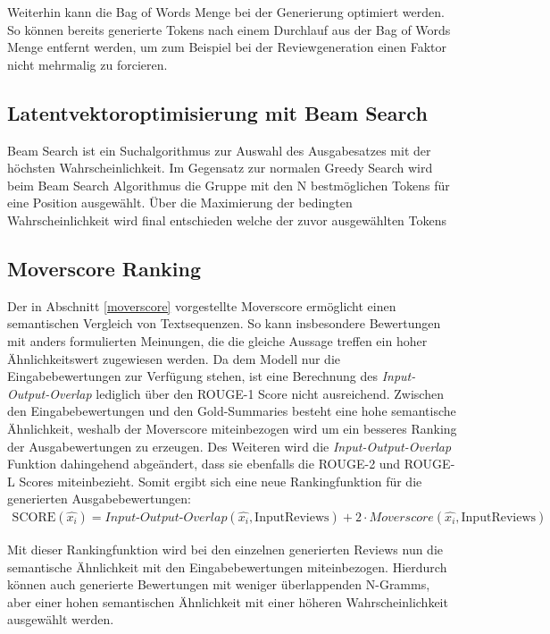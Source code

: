 Weiterhin kann die Bag of Words Menge bei der Generierung optimiert werden. 
So können bereits generierte Tokens nach einem Durchlauf aus der Bag of Words Menge entfernt werden, um zum Beispiel bei der Reviewgeneration einen Faktor nicht mehrmalig zu forcieren.


\subsection{Latentvektoroptimisierung mit Beam Search}
Beam Search ist ein Suchalgorithmus zur Auswahl des Ausgabesatzes mit der höchsten Wahrscheinlichkeit. 
Im Gegensatz zur normalen Greedy Search wird beim Beam Search Algorithmus die Gruppe mit den N bestmöglichen Tokens für eine Position ausgewählt. 
Über die Maximierung der bedingten Wahrscheinlichkeit wird final entschieden welche der zuvor ausgewählten Tokens 

\subsection{Moverscore Ranking}
\label{moverscore_ranking}
Der in Abschnitt \ref{moverscore} vorgestellte Moverscore ermöglicht einen semantischen Vergleich von Textsequenzen. 
So kann insbesondere Bewertungen mit anders formulierten Meinungen, die die gleiche Aussage treffen ein hoher Ähnlichkeitswert zugewiesen werden.
Da dem Modell nur die Eingabebewertungen zur Verfügung stehen, ist eine Berechnung des \textit{Input-Output-Overlap} lediglich über den ROUGE-1 Score nicht ausreichend.
Zwischen den Eingabebewertungen und den Gold-Summaries besteht eine hohe semantische Ähnlichkeit, weshalb der Moverscore miteinbezogen wird um ein besseres Ranking der Ausgabewertungen zu erzeugen.
Des Weiteren wird die \textit{Input-Output-Overlap} Funktion dahingehend abgeändert, dass sie ebenfalls die ROUGE-2 und ROUGE-L Scores miteinbezieht.
Somit ergibt sich eine neue Rankingfunktion für die generierten Ausgabebewertungen:
\begin{align*}
    \text{SCORE}(\hat{x_i}) = Input\text{-}Output\text{-}Overlap(\hat{x_i}, \text{InputReviews}) + 2 \cdot Moverscore(\hat{x_i}, \text{InputReviews})
\end{align*}

Mit dieser Rankingfunktion wird bei den einzelnen generierten Reviews nun die semantische Ähnlichkeit mit den Eingabebewertungen miteinbezogen. 
Hierdurch können auch generierte Bewertungen mit weniger überlappenden N-Gramms, aber einer hohen semantischen Ähnlichkeit mit einer höheren Wahrscheinlichkeit ausgewählt werden.

\pagebreak
